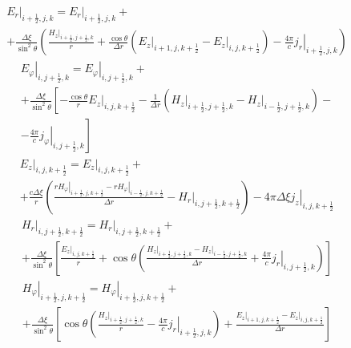 \documentclass[a4paper]{article}
\begin{document}
	\begin{multline*}
		\left.E_{r}\right|_{i+\frac{1}{2},j,k}=\left.E_{r}\right|_{i+\frac{1}{2},j,k}+\\+\frac{\Delta\xi}{\sin^{2}\theta}\left(\frac{\left.H_{z}\right|_{i+\frac{1}{2},j+\frac{1}{2},k}}{r}+\frac{\cos\theta}{\Delta r}\left(\left.E_{z}\right|_{i+1,j,k+\frac{1}{2}}-\left.E_{z}\right|_{i,j,k+\frac{1}{2}}\right)-\frac{4\pi}{c}\left.j_{r}\right|_{i+\frac{1}{2},j,k}\right)
	\end{multline*}
	\begin{multline*}
		\left.E_{\varphi}\right|_{i,j+\frac{1}{2},k}=\left.E_{\varphi}\right|_{i,j+\frac{1}{2},k}+\\
		+\frac{\Delta\xi}{\sin^{2}\theta}\left[-\frac{\cos\theta}{r}\left.E_{z}\right|_{i,j,k+\frac{1}{2}}-\frac{1}{\Delta r}\left(\left.H_{z}\right|_{i+\frac{1}{2},j+\frac{1}{2},k}-\left.H_{z}\right|_{i-\frac{1}{2},j+\frac{1}{2},k}\right)-\right.\\
		\left.-\frac{4\pi}{c}\left.j_{\varphi}\right|_{i,j+\frac{1}{2},k} \right]		
	\end{multline*}
	\begin{multline*}
		\left.E_{z}\right|_{i,j,k+\frac{1}{2}}=\left.E_{z}\right|_{i,j,k+\frac{1}{2}}+\\+\frac{c\Delta\xi}{r}\left(\frac{\left.rH_{\varphi}\right|_{i+\frac{1}{2},j,k+\frac{1}{2}}-\left.rH_{\varphi}\right|_{i-\frac{1}{2},j,k+\frac{1}{2}}}{\Delta r}-\left.H_{r}\right|_{i,j+\frac{1}{2},k+\frac{1}{2}}\right)-\left.4\pi\Delta\xi j_{z}\right|_{i,j,k+\frac{1}{2}}
	\end{multline*}
	\begin{multline*}
		\left.H_{r}\right|_{i,j+\frac{1}{2},k+\frac{1}{2}}=\left.H_{r}\right|_{i,j+\frac{1}{2},k+\frac{1}{2}}+\\
		+\frac{\Delta\xi}{\sin^{2}\theta}\left[\frac{\left.E_{z}\right|_{i,j,k+\frac{1}{2}}}{r}+\cos\theta\left(\frac{\left.H_{z}\right|_{i+\frac{1}{2},j+\frac{1}{2},k}-\left.H_{z}\right|_{i-\frac{1}{2},j+\frac{1}{2},k}}{\Delta r}+\frac{4\pi}{c}\left.j_{r}\right|_{i,j+\frac{1}{2},k}\right)\right]
	\end{multline*}
	\begin{multline*}
		\left.H_{\varphi}\right|_{i+\frac{1}{2},j,k+\frac{1}{2}}=\left.H_{\varphi}\right|_{i+\frac{1}{2},j,k+\frac{1}{2}}+\\
		+\frac{\Delta\xi}{\sin^{2}\theta}\left[\cos\theta\left(\frac{\left.H_{z}\right|_{i+\frac{1}{2},j+\frac{1}{2},k}}{r}-\frac{4\pi}{c}\left.j_{r}\right|_{i+\frac{1}{2},j,k}\right)+\frac{\left.E_{z}\right|_{i+1,j,k+\frac{1}{2}}-\left.E_{z}\right|_{i,j,k+\frac{1}{2}}}{\Delta r}\right]
	\end{multline*}
\end{document}

